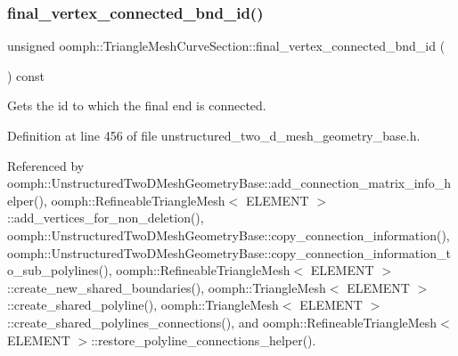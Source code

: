 \subsubsection{\texorpdfstring{final\+\_\+vertex\+\_\+connected\+\_\+bnd\+\_\+id()}{final\_vertex\_connected\_bnd\_id()}\hspace{0.1cm}{\footnotesize\ttfamily [1/2]}}
{\footnotesize\ttfamily unsigned oomph\+::\+Triangle\+Mesh\+Curve\+Section\+::final\+\_\+vertex\+\_\+connected\+\_\+bnd\+\_\+id (\begin{DoxyParamCaption}{ }\end{DoxyParamCaption}) const\hspace{0.3cm}{\ttfamily [inline]}}



Gets the id to which the final end is connected. 



Definition at line 456 of file unstructured\+\_\+two\+\_\+d\+\_\+mesh\+\_\+geometry\+\_\+base.\+h.



Referenced by oomph\+::\+Unstructured\+Two\+D\+Mesh\+Geometry\+Base\+::add\+\_\+connection\+\_\+matrix\+\_\+info\+\_\+helper(), oomph\+::\+Refineable\+Triangle\+Mesh$<$ E\+L\+E\+M\+E\+N\+T $>$\+::add\+\_\+vertices\+\_\+for\+\_\+non\+\_\+deletion(), oomph\+::\+Unstructured\+Two\+D\+Mesh\+Geometry\+Base\+::copy\+\_\+connection\+\_\+information(), oomph\+::\+Unstructured\+Two\+D\+Mesh\+Geometry\+Base\+::copy\+\_\+connection\+\_\+information\+\_\+to\+\_\+sub\+\_\+polylines(), oomph\+::\+Refineable\+Triangle\+Mesh$<$ E\+L\+E\+M\+E\+N\+T $>$\+::create\+\_\+new\+\_\+shared\+\_\+boundaries(), oomph\+::\+Triangle\+Mesh$<$ E\+L\+E\+M\+E\+N\+T $>$\+::create\+\_\+shared\+\_\+polyline(), oomph\+::\+Triangle\+Mesh$<$ E\+L\+E\+M\+E\+N\+T $>$\+::create\+\_\+shared\+\_\+polylines\+\_\+connections(), and oomph\+::\+Refineable\+Triangle\+Mesh$<$ E\+L\+E\+M\+E\+N\+T $>$\+::restore\+\_\+polyline\+\_\+connections\+\_\+helper().

\mbox{\label{classoomph_1_1TriangleMeshCurveSection_a2e75e110f491d19310afa66140e3cd1a}} 

